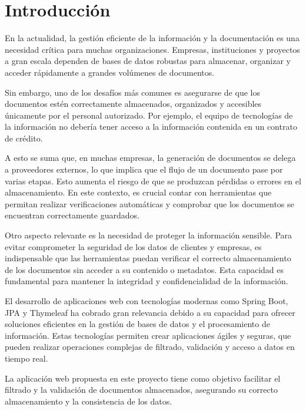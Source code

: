 \documentclass[draft]{scrbook}
\begin{document}
\tableofcontents
\listoffigures
\listoftables
\lstlistoflistings

\mainmatter %


\chapter{Introducción}
En la actualidad, la gestión eficiente de la información y la documentación es una necesidad crítica para muchas organizaciones. Empresas, instituciones y proyectos a gran escala dependen de bases de datos robustas para almacenar, organizar y acceder rápidamente a grandes volúmenes de documentos.

Sin embargo, uno de los desafíos más comunes es asegurarse de que los documentos estén correctamente almacenados, organizados y accesibles únicamente por el personal autorizado. Por ejemplo, el equipo de tecnologías de la información no debería tener acceso a la información contenida en un contrato de crédito.

A esto se suma que, en muchas empresas, la generación de documentos se delega a proveedores externos, lo que implica que el flujo de un documento pase por varias etapas. Esto aumenta el riesgo de que se produzcan pérdidas o errores en el almacenamiento. En este contexto, es crucial contar con herramientas que permitan realizar verificaciones automáticas y comprobar que los documentos se encuentran correctamente guardados.

Otro aspecto relevante es la necesidad de proteger la información sensible. Para evitar comprometer la seguridad de los datos de clientes y empresas, es indispensable que las herramientas puedan verificar el correcto almacenamiento de los documentos sin acceder a su contenido o metadatos. Esta capacidad es fundamental para mantener la integridad y confidencialidad de la información.

El desarrollo de aplicaciones web con tecnologías modernas como Spring Boot, JPA y Thymeleaf ha cobrado gran relevancia debido a su capacidad para ofrecer soluciones eficientes en la gestión de bases de datos y el procesamiento de información. Estas tecnologías permiten crear aplicaciones ágiles y seguras, que pueden realizar operaciones complejas de filtrado, validación y acceso a datos en tiempo real.

La aplicación web propuesta en este proyecto tiene como objetivo facilitar el filtrado y la validación de documentos almacenados, asegurando su correcto almacenamiento y la consistencia de los datos.
\end{document}
